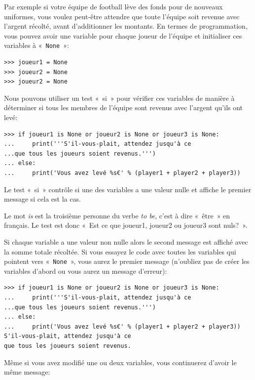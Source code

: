 Par exemple si votre équipe de football lève des fonds pour de nouveaux uniformes, vous voulez peut-être attendre que toute l'équipe soit revenue avec l'argent récolté, avant d'ad\-di\-tion\-ner les montants. En termes de programmation, vous pouvez avoir une variable pour chaque joueur de l'équipe et initialiser ces variables à « \texttt{None} »:

\begin{Verbatim}[frame=single,rulecolor=\color{mbleu}, label=à taper]
>>> joueur1 = None
>>> joueur2 = None
>>> joueur2 = None
\end{Verbatim}

Nous pouvons utiliser un test « si » pour vérifier ces variables de manière à déterminer si tous les membres de l'équipe sont revenus avec l'argent qu'ils ont levé:

\begin{Verbatim}[frame=single,rulecolor=\color{green}, label=à taper avec attention]
>>> if joueur1 is None or joueur2 is None or joueur3 is None:
...     print('''S'il-vous-plait, attendez jusqu'à ce 
...que tous les joueurs soient revenus.''')
... else:
...     print('Vous avez levé %s€' % (player1 + player2 + player3))
\end{Verbatim}

Le test « si » contrôle si une des variables a une valeur nulle et affiche le premier message si cela est la cas.

Le mot \emph{is} est la troisième personne du verbe \emph{to be}, c'est à dire « être » en français. Le test est donc « Est ce que joueur1, joueur2 ou joueur3 sont nuls? ». 

Si chaque variable a une valeur non nulle alors le second message est affiché avec la somme totale récoltée.
Si vous essayez le code avec toutes les variables qui pointent vers « \texttt{None} »,  vous aurez le premier message (n'oubliez pas de créer les variables d'abord ou vous aurez un message d'erreur):

\begin{Verbatim}[frame=single,rulecolor=\color{green}, label=à taper avec attention]
>>> if joueur1 is None or joueur2 is None or joueur3 is None:
...     print('''S'il-vous-plait, attendez jusqu'à ce 
...que tous les joueurs soient revenus.''')
... else:
...     print('Vous avez levé %s€' % (player1 + player2 + player3))
S'il-vous-plait, attendez jusqu'à ce 
que tous les joueurs soient revenus.
\end{Verbatim}

Même si vous avez modifié une ou deux variables, vous continuerez d'avoir le même message:


